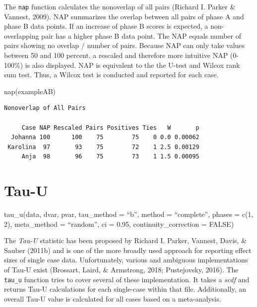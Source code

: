 \documentclass[
  letterpaper,
  DIV=11,
  numbers=noendperiod]{scrreprt}
\newenvironment{Shaded}{\begin{snugshade}}{\end{snugshade}}
\newcommand{\FunctionTok}[1]{\textcolor[rgb]{0.28,0.35,0.67}{#1}}
\newcommand{\NormalTok}[1]{\textcolor[rgb]{0.00,0.23,0.31}{#1}}
\begin{document}
The \texttt{nap} function calculates the nonoverlap of all pairs
(Richard I. Parker \& Vannest, 2009). NAP summarizes the overlap between
all pairs of phase A and phase B data points. If an increase of phase B
scores is expected, a non-overlapping pair has a higher phase B data
point. The NAP equals number of pairs showing no overlap / number of
pairs. Because NAP can only take values between 50 and 100 percent, a
rescaled and therefore more intuitive NAP (0-100\%) is also displayed.
NAP is equivalent to the the U-test and Wilcox rank sum test. Thus, a
Wilcox test is conducted and reported for each case.

\begin{Shaded}
\begin{Highlighting}[]
\FunctionTok{nap}\NormalTok{(exampleAB)}
\end{Highlighting}
\end{Shaded}

\begin{verbatim}
Nonoverlap of All Pairs

     Case NAP Rescaled Pairs Positives Ties   W       p
  Johanna 100      100    75        75    0 0.0 0.00062
 Karolina  97       93    75        72    1 2.5 0.00129
     Anja  98       96    75        73    1 1.5 0.00095
\end{verbatim}

\hypertarget{tau-u}{%
\section{Tau-U}\label{tau-u}}

\begin{tcolorbox}[enhanced jigsaw, toprule=.15mm, colframe=quarto-callout-tip-color-frame, left=2mm, colback=white, breakable, bottomrule=.15mm, arc=.35mm, rightrule=.15mm, leftrule=.75mm, opacityback=0]
\begin{minipage}[t]{5.5mm}
\textcolor{quarto-callout-tip-color}{\faLightbulb}
\end{minipage}%
\begin{minipage}[t]{\textwidth - 5.5mm}
tau\_u(data, dvar, pvar, tau\_method = ``b'', method = ``complete'',
phases = c(1, 2), meta\_method = ``random'', ci = 0.95,
continuity\_correction = FALSE)\end{minipage}%
\end{tcolorbox}

The \emph{Tau-U} statistic has been proposed by Richard I. Parker,
Vannest, Davis, \& Sauber (2011b) and is one of the more broadly used
approach for reporting effect sizes of single case data. Unfortunately,
various and ambiguous implementations of Tau-U exist (Brossart, Laird,
\& Armstrong, 2018; Pustejovsky, 2016). The \texttt{tau\_u} function
tries to cover several of these implementation. It takes a \emph{scdf}
and returns Tau-U calculations for each single-case within that file.
Additionally, an overall Tau-U value is calculated for all cases based
on a meta-analysis.
\end{document}
